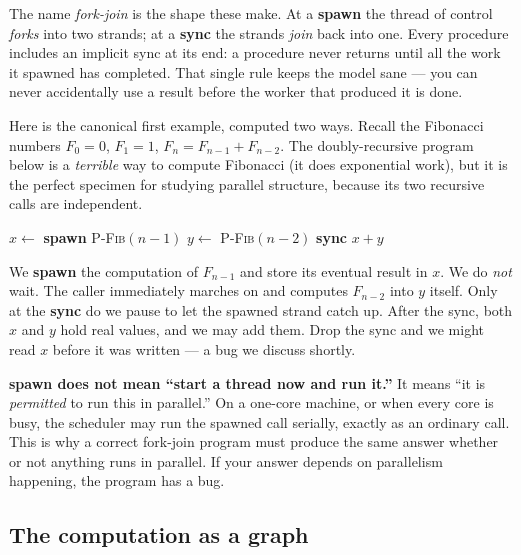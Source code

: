 The name \emph{fork-join} is the shape these make. At a \textbf{spawn} the thread
of control \emph{forks} into two strands; at a \textbf{sync} the strands
\emph{join} back into one. Every procedure includes an implicit sync at its end:
a procedure never returns until all the work it spawned has completed.
That single rule keeps the model sane --- you can never accidentally use a result
before the worker that produced it is done.

Here is the canonical first example, computed two ways. Recall the Fibonacci
numbers $F_0=0$, $F_1=1$, $F_n=F_{n-1}+F_{n-2}$. The doubly-recursive program
below is a \emph{terrible} way to compute Fibonacci (it does exponential work),
but it is the perfect specimen for studying parallel structure, because its two
recursive calls are independent.

\begin{algorithm}[H]
\caption{\textsc{P-Fib}$(n)$}
$x \gets$ \textbf{spawn} \textsc{P-Fib}$(n-1)$
$y \gets$ \textsc{P-Fib}$(n-2)$
\textbf{sync}
\Return $x + y$\;
\end{algorithm}

We \textbf{spawn} the computation of $F_{n-1}$ and store its
eventual result in $x$. We do \emph{not} wait. The caller immediately marches on
and computes $F_{n-2}$ into $y$ itself. Only at the \textbf{sync} do we pause to
let the spawned strand catch up. After the sync, both $x$ and $y$ hold real
values, and we may add them. Drop the sync and we might read $x$ before it was
written --- a bug we discuss shortly.

\begin{trapbox}
\textbf{spawn does not mean ``start a thread now and run it.''} It means ``it is
\emph{permitted} to run this in parallel.'' On a one-core machine, or when every
core is busy, the scheduler may run the spawned call serially, exactly as
an ordinary call. This is why a correct fork-join program must produce the same
answer whether or not anything runs in parallel. If your answer depends
on parallelism happening, the program has a bug.
\end{trapbox}

\subsection{The computation as a graph}

